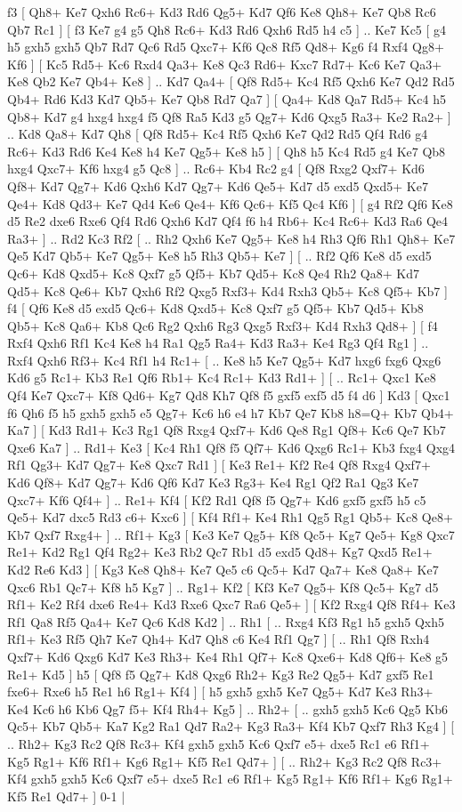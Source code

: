  f3 [  Qh8+ Ke7  Qxh6 Rc6+  Kd3 Rd6  Qg5+ Kd7  Qf6 Ke8  Qh8+ Ke7  Qb8 Rc6  Qb7 Rc1   ]  [  f3 Ke7  g4 g5  Qh8 Rc6+  Kd3 Rd6  Qxh6 Rd5  h4 c5   ] .. Ke7    Kc5 [  g4 h5  gxh5 gxh5  Qb7 Rd7  Qc6 Rd5  Qxc7+ Kf6  Qc8 Rf5  Qd8+ Kg6  f4 Rxf4  Qg8+ Kf6   ]  [  Kc5 Rd5+  Kc6 Rxd4  Qa3+ Ke8  Qc3 Rd6+  Kxc7 Rd7+  Kc6 Ke7  Qa3+ Ke8  Qb2 Ke7  Qb4+ Ke8   ] .. Kd7    Qa4+ [  Qf8 Rd5+  Kc4 Rf5  Qxh6 Ke7  Qd2 Rd5  Qb4+ Rd6  Kd3 Kd7  Qb5+ Ke7  Qb8 Rd7  Qa7   ]  [  Qa4+ Kd8  Qa7 Rd5+  Kc4 h5  Qb8+ Kd7  g4 hxg4  hxg4 f5  Qf8 Ra5  Kd3 g5  Qg7+ Kd6  Qxg5 Ra3+  Ke2 Ra2+   ] .. Kd8    Qa8+   Kd7    Qh8 [  Qf8 Rd5+  Kc4 Rf5  Qxh6 Ke7  Qd2 Rd5  Qf4 Rd6  g4 Rc6+  Kd3 Rd6  Ke4 Ke8  h4 Ke7  Qg5+ Ke8  h5   ]  [  Qh8 h5  Kc4 Rd5  g4 Ke7  Qb8 hxg4  Qxc7+ Kf6  hxg4 g5  Qc8   ] .. Rc6+    Kb4   Rc2    g4 [  Qf8 Rxg2  Qxf7+ Kd6  Qf8+ Kd7  Qg7+ Kd6  Qxh6 Kd7  Qg7+ Kd6  Qe5+ Kd7  d5 exd5  Qxd5+ Ke7  Qe4+ Kd8  Qd3+ Ke7  Qd4 Ke6  Qe4+ Kf6  Qc6+ Kf5  Qc4 Kf6   ]  [  g4 Rf2  Qf6 Ke8  d5 Re2  dxe6 Rxe6  Qf4 Rd6  Qxh6 Kd7  Qf4 f6  h4 Rb6+  Kc4 Rc6+  Kd3 Ra6  Qe4 Ra3+   ] .. Rd2    Kc3   Rf2 [ .. Rh2  Qxh6 Ke7  Qg5+ Ke8  h4 Rh3  Qf6 Rh1  Qh8+ Ke7  Qe5 Kd7  Qb5+ Ke7  Qg5+ Ke8  h5 Rh3  Qb5+ Ke7   ]  [ .. Rf2  Qf6 Ke8  d5 exd5  Qc6+ Kd8  Qxd5+ Kc8  Qxf7 g5  Qf5+ Kb7  Qd5+ Kc8  Qe4 Rh2  Qa8+ Kd7  Qd5+ Kc8  Qe6+ Kb7  Qxh6 Rf2  Qxg5 Rxf3+  Kd4 Rxh3  Qb5+ Kc8  Qf5+ Kb7   ]  f4 [  Qf6 Ke8  d5 exd5  Qc6+ Kd8  Qxd5+ Kc8  Qxf7 g5  Qf5+ Kb7  Qd5+ Kb8  Qb5+ Kc8  Qa6+ Kb8  Qc6 Rg2  Qxh6 Rg3  Qxg5 Rxf3+  Kd4 Rxh3  Qd8+   ]  [  f4 Rxf4  Qxh6 Rf1  Kc4 Ke8  h4 Ra1  Qg5 Ra4+  Kd3 Ra3+  Ke4 Rg3  Qf4 Rg1   ] .. Rxf4    Qxh6   Rf3+    Kc4   Rf1    h4   Rc1+ [ .. Ke8  h5 Ke7  Qg5+ Kd7  hxg6 fxg6  Qxg6 Kd6  g5 Rc1+  Kb3 Re1  Qf6 Rb1+  Kc4 Rc1+  Kd3 Rd1+   ]  [ .. Rc1+  Qxc1 Ke8  Qf4 Ke7  Qxc7+ Kf8  Qd6+ Kg7  Qd8 Kh7  Qf8 f5  gxf5 exf5  d5 f4  d6   ]  Kd3 [  Qxc1 f6  Qh6 f5  h5 gxh5  gxh5 e5  Qg7+ Kc6  h6 e4  h7 Kb7  Qe7 Kb8  h8=Q+ Kb7  Qb4+ Ka7   ]  [  Kd3 Rd1+  Kc3 Rg1  Qf8 Rxg4  Qxf7+ Kd6  Qe8 Rg1  Qf8+ Kc6  Qe7 Kb7  Qxe6 Ka7   ] .. Rd1+    Ke3 [  Kc4 Rh1  Qf8 f5  Qf7+ Kd6  Qxg6 Rc1+  Kb3 fxg4  Qxg4 Rf1  Qg3+ Kd7  Qg7+ Ke8  Qxc7 Rd1   ]  [  Ke3 Re1+  Kf2 Re4  Qf8 Rxg4  Qxf7+ Kd6  Qf8+ Kd7  Qg7+ Kd6  Qf6 Kd7  Ke3 Rg3+  Ke4 Rg1  Qf2 Ra1  Qg3 Ke7  Qxc7+ Kf6  Qf4+   ] .. Re1+    Kf4 [  Kf2 Rd1  Qf8 f5  Qg7+ Kd6  gxf5 gxf5  h5 c5  Qe5+ Kd7  dxc5 Rd3  c6+ Kxc6   ]  [  Kf4 Rf1+  Ke4 Rh1  Qg5 Rg1  Qb5+ Kc8  Qe8+ Kb7  Qxf7 Rxg4+   ] .. Rf1+    Kg3 [  Ke3 Ke7  Qg5+ Kf8  Qc5+ Kg7  Qe5+ Kg8  Qxc7 Re1+  Kd2 Rg1  Qf4 Rg2+  Ke3 Rb2  Qc7 Rb1  d5 exd5  Qd8+ Kg7  Qxd5 Re1+  Kd2 Re6  Kd3   ]  [  Kg3 Ke8  Qh8+ Ke7  Qe5 c6  Qc5+ Kd7  Qa7+ Ke8  Qa8+ Ke7  Qxc6 Rb1  Qc7+ Kf8  h5 Kg7   ] .. Rg1+    Kf2 [  Kf3 Ke7  Qg5+ Kf8  Qc5+ Kg7  d5 Rf1+  Ke2 Rf4  dxe6 Re4+  Kd3 Rxe6  Qxc7 Ra6  Qe5+   ]  [  Kf2 Rxg4  Qf8 Rf4+  Ke3 Rf1  Qa8 Rf5  Qa4+ Ke7  Qc6 Kd8  Kd2   ] .. Rh1 [ .. Rxg4  Kf3 Rg1  h5 gxh5  Qxh5 Rf1+  Ke3 Rf5  Qh7 Ke7  Qh4+ Kd7  Qh8 c6  Ke4 Rf1  Qg7   ]  [ .. Rh1  Qf8 Rxh4  Qxf7+ Kd6  Qxg6 Kd7  Ke3 Rh3+  Ke4 Rh1  Qf7+ Kc8  Qxe6+ Kd8  Qf6+ Ke8  g5 Re1+  Kd5   ]  h5 [  Qf8 f5  Qg7+ Kd8  Qxg6 Rh2+  Kg3 Re2  Qg5+ Kd7  gxf5 Re1  fxe6+ Rxe6  h5 Re1  h6 Rg1+  Kf4   ]  [  h5 gxh5  gxh5 Ke7  Qg5+ Kd7  Ke3 Rh3+  Ke4 Kc6  h6 Kb6  Qg7 f5+  Kf4 Rh4+  Kg5   ] .. Rh2+ [ .. gxh5  gxh5 Kc6  Qg5 Kb6  Qc5+ Kb7  Qb5+ Ka7  Kg2 Ra1  Qd7 Ra2+  Kg3 Ra3+  Kf4 Kb7  Qxf7 Rh3  Kg4   ]  [ .. Rh2+  Kg3 Rc2  Qf8 Rc3+  Kf4 gxh5  gxh5 Kc6  Qxf7 e5+  dxe5 Rc1  e6 Rf1+  Kg5 Rg1+  Kf6 Rf1+  Kg6 Rg1+  Kf5 Re1  Qd7+   ]  [ .. Rh2+  Kg3 Rc2  Qf8 Rc3+  Kf4 gxh5  gxh5 Kc6  Qxf7 e5+  dxe5 Rc1  e6 Rf1+  Kg5 Rg1+  Kf6 Rf1+  Kg6 Rg1+  Kf5 Re1  Qd7+   ] 0-1  |
